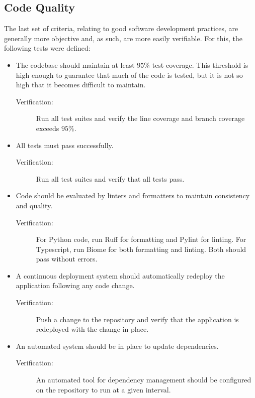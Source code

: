 \subsection{Code Quality}
The last set of criteria, relating to good software development practices, are generally more objective and, as such, are more easily verifiable. For this, the following tests were defined:
\begin{itemize}
    \item The codebase should maintain at least $95\%$ test coverage. This threshold is high enough to guarantee that much of the code is tested, but it is not so high that it becomes difficult to maintain.
    \begin{description}
        \item[Verification:] Run all test suites and verify the line coverage and branch coverage exceeds $95\%.$
    \end{description}
    \item All tests must pass successfully.
    \begin{description}
        \item[Verification:] Run all test suites and verify that all tests pass.
    \end{description}
    \item Code should be evaluated by linters and formatters to maintain consistency and quality.
    \begin{description}
        \item[Verification:] For Python code, run Ruff for formatting and Pylint for linting. For Typescript, run Biome for both formatting and linting. Both should pass without errors.
    \end{description}
    \item A continuous deployment system should automatically redeploy the application following any code change.
    \begin{description}
        \item[Verification:] Push a change to the repository and verify that the application is redeployed with the change in place.
    \end{description}
    \item An automated system should be in place to update dependencies.
    \begin{description}
        \item[Verification:] An automated tool for dependency management should be configured on the repository to run at a given interval.
    \end{description}
\end{itemize}


